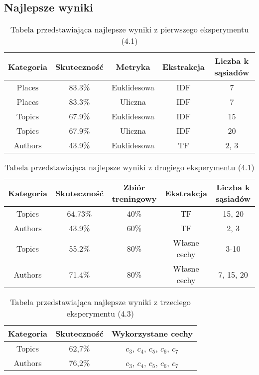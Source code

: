 \documentclass{classrep}
\begin{document}
\subsection{Najlepsze wyniki}
\begin{table}[H]
	\centering
	\begin{tabular}{c c c c c} 
		\hline
		\textbf{Kategoria} & \textbf{Skuteczność} & \textbf{Metryka} & \textbf{Ekstrakcja} &  \textbf{Liczba k sąsiadów} \\ [0.5ex]
		\hline
		\hline 
		Places & 83.3\% & Euklidesowa & IDF & 7 \\
		Places & 83.3\% & Uliczna & IDF & 7 \\
		Topics & 67.9\% & Euklidesowa & IDF & 15 \\
		Topics & 67.9\% & Uliczna & IDF & 20 \\
		Authors & 43.9\% & Euklidesowa & TF & 2, 3 \\
		\hline
	\end{tabular}
	\caption{Tabela przedstawiająca najlepsze wyniki z pierwszego eksperymentu (4.1)}
\end{table}

\begin{table}[H]
	\centering
	\begin{tabular}{c c c c c} 
		\hline
		\textbf{Kategoria} & \textbf{Skuteczność} & \textbf{Zbiór treningowy} & \textbf{Ekstrakcja} &  \textbf{Liczba k sąsiadów} \\ [0.5ex]
		\hline
		\hline 
		Topics & 64.73\% & 40\% & TF & 15, 20 \\
		Authors & 43.9\% & 60\% & TF & 2, 3 \\
		Topics & 55.2\% & 80\% & Własne cechy & 3-10 \\
		Authors & 71.4\% & 80\% & Własne cechy & 7, 15, 20 \\
		\hline
	\end{tabular}
	\caption{Tabela przedstawiająca najlepsze wyniki z drugiego eksperymentu (4.1)}
\end{table}

\begin{table}[H]
	\centering
	\begin{tabular}{c c c} 
		\hline
		\textbf{Kategoria} & \textbf{Skuteczność} & \textbf{Wykorzystane cechy} \\ [0.5ex]
		\hline
		\hline 
		Topics & 62,7\% & $c_{3}$, $c_{4}$, $c_{5}$, $c_{6}$, $c_{7}$ \\
		Authors & 76,2\% & $c_{3}$, $c_{4}$, $c_{5}$, $c_{6}$, $c_{7}$ \\
		\hline
	\end{tabular}
	\caption{Tabela przedstawiająca najlepsze wyniki z trzeciego eksperymentu (4.3)}
\end{table}
\end{document}
